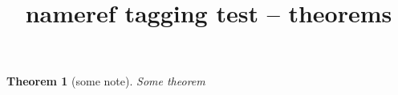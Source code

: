 \documentclass{article}
\title{nameref tagging test -- theorems}
\newtheorem{theorem}{Theorem}
\begin{document}
\begin{theorem}[some note]\label{foo}
Some theorem
\end{theorem}
\end{document}
